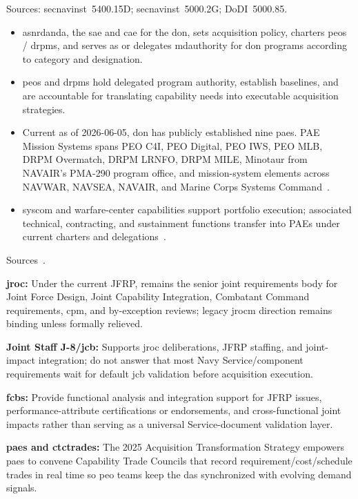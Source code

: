 \documentclass[../main.tex]{subfiles}
\begin{document}
\begin{description}[style=nextline, labelsep=0.5em, font=\bfseries]
  \item[\textbf{Department acquisition governance.}]
        Sources: \ac{secnavinst}~5400.15D; \ac{secnavinst}~5000.2G; DoDI~5000.85.
        \begin{itemize}
          \item \ac{asnrdanda}, the \ac{sae} and \ac{cae} for the \ac{don}, sets acquisition policy, charters \acp{peo} / \acp{drpm}, and serves as or delegates \ac{mdauthority} for \ac{don} programs according to category and designation.
          \item \acp{peo} and \acp{drpm} hold delegated program authority, establish baselines, and are accountable for translating capability needs into executable acquisition strategies.
          \item Current as of 2026-06-05, \ac{don} has publicly established nine \acp{pae}. PAE Mission Systems spans PEO C4I, PEO Digital, PEO IWS, PEO MLB, DRPM Overmatch, DRPM LRNFO, DRPM MILE, Minotaur from NAVAIR's PMA-290 program office, and mission-system elements across NAVWAR, NAVSEA, NAVAIR, and Marine Corps Systems Command~\autocite{DON-PAE-Expansion-May2026,DON-PAE-Mission-Systems-2026}.
          \item \ac{syscom} and warfare-center capabilities support portfolio execution; associated technical, contracting, and sustainment functions transfer into PAEs under current charters and delegations~\autocite{DON-PAE-Expansion-May2026}.
        \end{itemize}

  \item[\textbf{Joint requirements governance.}]
        Sources~\autocite{edo-3-3-3-jfrp-2026,secwar-acq-transformation-2025}.
        \begin{description}
          \item \textbf{\ac{jroc}:} Under the current JFRP, remains the senior joint requirements body for Joint Force Design, Joint Capability Integration, Combatant Command requirements, \ac{cpm}, and by-exception reviews; legacy \ac{jrocm} direction remains binding unless formally relieved.
          \item \textbf{Joint Staff J-8/\ac{jcb}:} Supports \ac{jroc} deliberations, JFRP staffing, and joint-impact integration; do not answer that most Navy Service/component requirements wait for default \ac{jcb} validation before acquisition execution.
          \item \textbf{\acp{fcb}:} Provide functional analysis and integration support for JFRP issues, performance-attribute certifications or endorsements, and cross-functional joint impacts rather than serving as a universal Service-document validation layer.
          \item \textbf{\acp{pae} and \acp{ctctrade}:} The 2025 Acquisition Transformation Strategy empowers \acp{pae} to convene Capability Trade Councils that record requirement/cost/schedule trades in real time so \ac{peo} teams keep the \ac{das} synchronized with evolving demand signals.
        \end{description}


\end{description}
\end{document}

